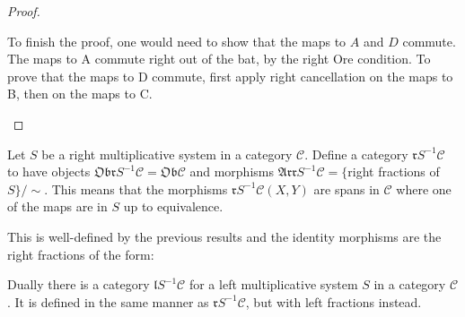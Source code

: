 \begin{proof}
        \begin{center}
            \begin{minipage}[c]{0.3\textwidth}
            \end{minipage}
            \begin{minipage}[c]{0.5\textwidth}
                To finish the proof, one would need to show that the maps to $A$ and $D$ commute. The maps to A commute right out of the bat, by the right Ore condition. To prove that the maps to D commute, first apply right cancellation on the maps to B, then on the maps to C.
            \end{minipage}
        \end{center}
    \end{proof}

    \begin{definition}
        Let $S$ be a right multiplicative system in a category $\mathcal{C}$. Define a category $\mathfrak{r}S^{-1}\mathcal{C}$ to have objects $\mathfrak{Obr}S^{-1}\mathcal{C}=\mathfrak{Ob}\mathcal{C}$ and morphisms $\mathfrak{Arr}S^{-1}\mathcal{C} = \{$right fractions of $S\}/\sim$. This means that the morphisms $\mathfrak{r}S^{-1}\mathcal{C}(X,Y)$ are spans in $\mathcal{C}$ where one of the maps are in $S$ up to equivalence.
        \begin{center}
        \end{center}
        This is well-defined by the previous results and the identity morphisms are the right fractions of the form:
        \begin{center}
        \end{center}
    \end{definition}

    \begin{remark}
        Dually there is a category $\mathfrak{l}S^{-1}\mathcal{C}$ for a left multiplicative system $S$ in a category $\mathcal{C}$. It is defined in the same manner as $\mathfrak{r}S^{-1}\mathcal{C}$, but with left fractions instead.
    \end{remark}

